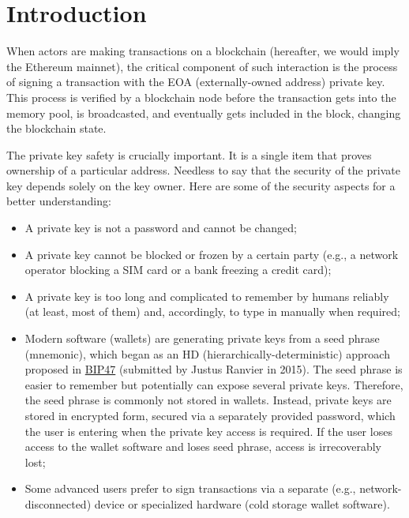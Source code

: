 \documentclass[12pt]{article}
\begin{document}
\section{Introduction}\normalsize

When actors are making transactions on a blockchain (hereafter, we would imply the Ethereum mainnet), the critical component of such interaction is the process of signing a transaction with the EOA (externally-owned address) private key. This process is verified by a blockchain node before the transaction gets into the memory pool, is broadcasted, and eventually gets included in the block, changing the blockchain state.

The private key safety is crucially important. It is a single item that proves ownership of a particular address. Needless to say that the security of the private key depends solely on the key owner. Here are some of the security aspects for a better understanding:
\begin{itemize}
\item{A private key is not a password and cannot be changed;}
\item{A private key cannot be blocked or frozen by a certain party (e.g., a network operator blocking a SIM card or a bank freezing a credit card);}
\item{A private key is too long and complicated to remember by humans reliably (at least, most of them) and, accordingly, to type in manually when required;}
\item{Modern software (wallets) are generating private keys from a seed phrase (mnemonic), which began as an HD (hierarchically-deterministic) approach proposed in \href{https://github.com/OpenBitcoinPrivacyProject/bips/blob/master/bip-0047.mediawiki}{BIP47}\cite{bip47} (submitted by Justus Ranvier in 2015). The seed phrase is easier to remember but potentially can expose several private keys. Therefore, the seed phrase is commonly not stored in wallets. Instead, private keys are stored in encrypted form, secured via a separately provided password, which the user is entering when the private key access is required. If the user loses access to the wallet software and loses seed phrase, access is irrecoverably lost;}
\item{ Some advanced users prefer to sign transactions via a separate (e.g., network-disconnected) device or specialized hardware (cold storage wallet software).}
\end{itemize}
\end{document}
